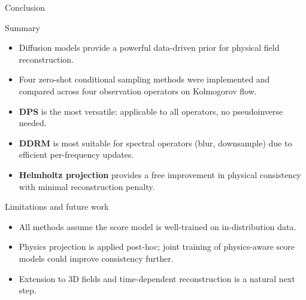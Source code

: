 \documentclass[9pt]{beamer}
\begin{document}
\begin{frame}{Conclusion}
\begin{block}{Summary}
\begin{itemize}
  \item Diffusion models provide a powerful data-driven prior for physical field reconstruction.
  \item Four zero-shot conditional sampling methods were implemented and compared
        across four observation operators on Kolmogorov flow.
  \item \textbf{DPS} is the most versatile: applicable to all operators, no pseudoinverse needed.
  \item \textbf{DDRM} is most suitable for spectral operators (blur, downsample) due to efficient
        per-frequency updates.
  \item \textbf{Helmholtz projection} provides a free improvement in physical consistency
        with minimal reconstruction penalty.
\end{itemize}
\end{block}
\begin{block}{Limitations and future work}
\begin{itemize}
  \item All methods assume the score model is well-trained on in-distribution data.
  \item Physics projection is applied post-hoc; joint training of physics-aware score models
        could improve consistency further.
  \item Extension to 3D fields and time-dependent reconstruction is a natural next step.
\end{itemize}
\end{block}
\end{frame}

\end{document}
